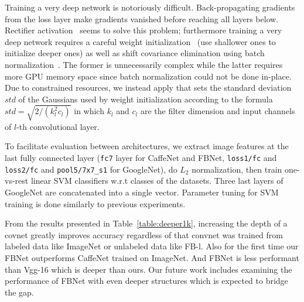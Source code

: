 \documentclass[preprint,12pt]{elsarticle}
\begin{document}
Training a very deep network is notoriously difficult. Back-propagating gradients from the loss layer make gradients vanished before reaching all layers below. Rectifier activation~\cite{DBLP:journals/jmlr/GlorotBB11} seems to solve this problem; furthermore training a very deep network requires a careful weight initialization~\cite{romero2014fitnets} (use shallower ones to initialize deeper ones) as well as shift covariance elimination using batch normalization~\cite{DBLP:conf/icml/IoffeS15}. The former is unnecessarily complex while the latter requires more GPU memory space since batch normalization could not be done in-place. Due to constrained resources, we instead apply \cite{he2015delving} that sets the standard deviation $std$ of the Gaussians used by weight initialization according to the formula $std=\sqrt{2/(k_l^2c_l)}$ in which $k_l$ and $c_l$ are the filter dimension and input channels of $l$-th convolutional layer.

To facilitate evaluation between architectures, we extract image features at the last fully connected layer (\texttt{fc7} layer for CaffeNet and FBNet, \texttt{loss1/fc} and \texttt{loss2/fc} and \texttt{pool5/7x7\_s1} for GoogleNet), do $L_2$ normalization, then train one-vs-rest linear SVM classifiers w.r.t classes of the datasets. Three last layers of GoogleNet are concatenated into a single vector. Parameter tuning for SVM training is done similarly to previous experiments. 

From the results presented in Table~\ref{table:deeper1k}, increasing the depth of a covnet greatly improves accuracy regardless of that convnet was trained from labeled data like  ImageNet or unlabeled data like FB-l. Also for the first time our FBNet outperforms CaffeNet trained on ImageNet. And FBNet is less performant than Vgg-16 which is deeper than ours. Our future work includes examining the performance of FBNet with even deeper structures which is expected to bridge the gap.
\end{document}
